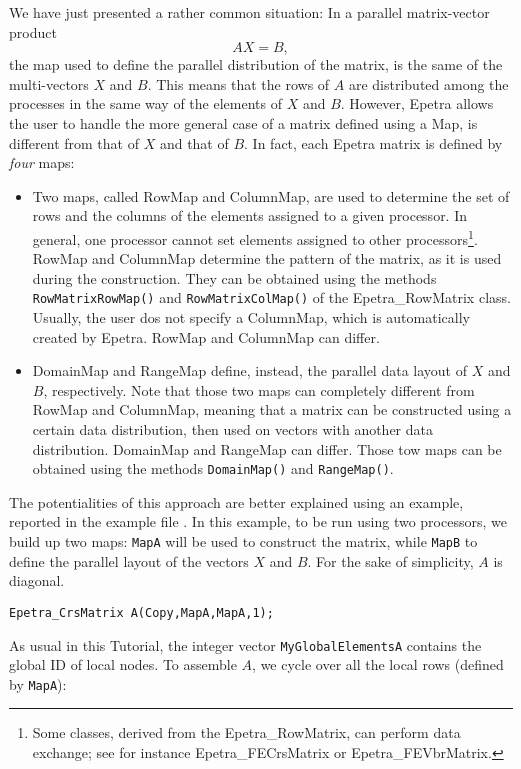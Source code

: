 We have just presented a rather common situation: In a parallel
matrix-vector product
\[
A X = B ,
\]
the map used to define the parallel distribution of the matrix, is the
same of the multi-vectors $X$ and $B$.  This means that the rows of
$A$ are distributed among the processes in the same way of the elements
of $X$ and $B$.  However, Epetra allows the user to handle the more
general case of a matrix defined using a Map, is different from that of
$X$ and that of $B$. In fact, each Epetra matrix is defined by {\sl
  four} maps:
\begin{itemize}
\item Two maps, called RowMap and ColumnMap, are used to determine the
  set of rows and the columns of the elements assigned to a given
  processor. In general, one processor cannot set elements assigned to
  other processors\footnote{Some classes, derived from the
    Epetra\_RowMatrix, can perform data exchange; see for instance
    Epetra\_FECrsMatrix or Epetra\_FEVbrMatrix.}. RowMap and ColumnMap
  determine the pattern of the matrix, as it is used during the
  construction. They can be obtained using the methods
  \verb!RowMatrixRowMap()!  and \verb!RowMatrixColMap()! of the
  Epetra\_RowMatrix class. Usually, the user dos not specify a
  ColumnMap, which is automatically created by Epetra.  RowMap and
  ColumnMap can differ.
\item DomainMap and RangeMap define, instead, the parallel data layout
  of $X$ and $B$, respectively. Note that those two maps can completely
  different from RowMap and ColumnMap, meaning that a matrix can be
  constructed using a certain data distribution, then used on vectors
  with another data distribution. DomainMap and RangeMap can
  differ. Those tow maps can be obtained using the methods
  \verb!DomainMap()! and \verb!RangeMap()!.
\end{itemize}
The potentialities of this approach are better explained using an
example, reported in the example file . In this
example, to be run using two processors, we build up two maps:
\verb!MapA! will be used to construct the matrix, while \verb!MapB! to
define the parallel layout of the vectors $X$ and $B$. For the sake of
simplicity, $A$ is diagonal.
\begin{verbatim}
Epetra_CrsMatrix A(Copy,MapA,MapA,1);
\end{verbatim}
As usual in this Tutorial, the integer vector \verb!MyGlobalElementsA!
contains the global ID of local nodes. To assemble $A$, we cycle over
all the local rows (defined by \verb!MapA!):
